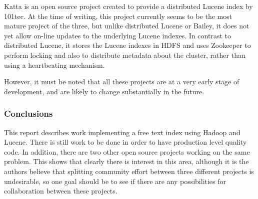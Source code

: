 \documentclass[a4paper,10pt]{article}
\begin{document}
Katta \cite{katta} is an open source project created to provide a distributed Lucene index by 101tec. At the time of writing, this project currently seems to be the most mature project of the three, but unlike distributed Lucene or Bailey, it does not yet allow on-line updates to the underlying Lucene indexes. In contrast to distributed Lucene, it stores the Lucene indexes in HDFS and uses Zookeeper \cite{zookeeper} to perform locking and also to distribute metadata about the cluster, rather than using a heartbeating mechanism.

However, it must be noted that all these projects are at a very early stage of development, and are likely to change substantially in the future.

\subsubsection{Conclusions}

This report describes work implementing a free text index using Hadoop and Lucene. There is still work to be done in order to have production level quality code. In addition, there are two other open source projects working on the same problem. This shows that clearly there is interest in this area, although it is the authors believe that splitting community effort between three different projects is undesirable, so one goal should be to see if there are any possibilities for collaboration between these projects. 


 
\end{document}
